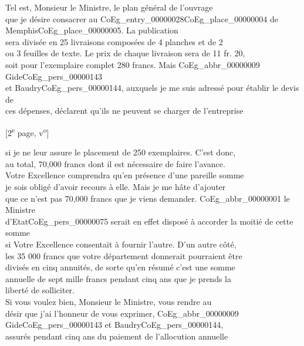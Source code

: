 \documentclass{book}
\begin{document}
\indent Tel est, Monsieur le Ministre, le plan général de l’ouvrage\\
que je désire consacrer au \Gls{CoEg_entry_00000028}\gls{CoEg_place_00000004} de Memphis\gls{CoEg_place_00000005}. La publication\\
sera divisée en 25 livraisons composées de 4 planches et de 2\\
ou 3 feuilles de texte. Le prix de chaque livraison sera de 11 fr. 20,\\
soit pour l’exemplaire complet 280 francs. Mais \gls{CoEg_abbr_00000009} Gide\gls{CoEg_pers_00000143}\\
et Baudry\gls{CoEg_pers_00000144}, auxquels je me suis adressé pour établir le devis de\\
ces dépenses, déclarent qu’ils ne peuvent se charger de l’entreprise
{\footnotesize\begin{center} {[2\textsuperscript{e} page, v\textsuperscript{o}]}\end{center}}
\noindent si je ne leur assure le placement de 250 exemplaires. C’est donc,\\
au total, 70,000 francs dont il est nécessaire de faire l’avance.\\
\indent Votre Excellence comprendra qu’en présence d’une pareille somme\\
je sois obligé d’avoir recours à elle. Mais je me hâte d’ajouter\\
que ce n’est pas 70,000 francs que je viens demander. \gls{CoEg_abbr_00000001} le Ministre\\
d’Etat\gls{CoEg_pers_00000075} serait en effet disposé à accorder la moitié de cette somme\\
si Votre Excellence consentait à fournir l’autre. D’un autre côté,\\
les 35 000 francs que votre département donnerait pourraient être\\
divisés en cinq annuités, de sorte qu’en résumé c’est une somme\\
annuelle de sept mille francs pendant cinq ans que je prends la\\
liberté de solliciter.\\
\indent Si vous voulez bien, Monsieur le Ministre, vous rendre au\\
désir que j’ai l’honneur de vous exprimer, \gls{CoEg_abbr_00000009} Gide\gls{CoEg_pers_00000143} et Baudry\gls{CoEg_pers_00000144},\\
assurés pendant cinq ans du paiement de l’allocution annuelle\\
\end{document}
